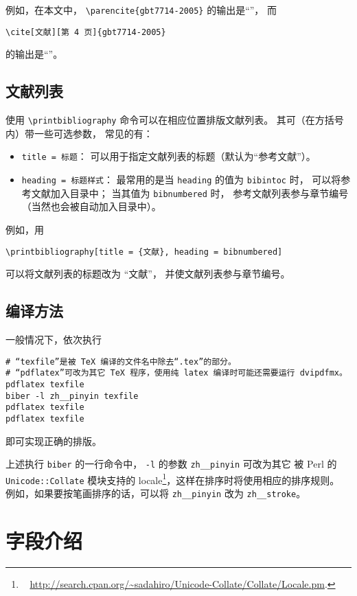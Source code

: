 \documentclass[UTF8]{ctexart}
\begin{document}
例如，在本文中，%
\verb|\parencite{gbt7714-2005}| 的输出是“\parencite{gbt7714-2005}”，
而
\begin{Verbatim}[frame = single]
\cite[文献][第 4 页]{gbt7714-2005}
\end{Verbatim}
的输出是“\cite[文献][第 4 页]{gbt7714-2005}”。

\subsection{文献列表}

使用 \verb|\printbibliography| 命令可以在相应位置排版文献列表。
其可（在方括号内）带一些可选参数\supercite{biblatex}，
常见的有：
\begin{itemize}
	\item \verb|title = 标题|：
		可以用于指定文献列表的标题（默认为“参考文献”）。
	\item \verb|heading = 标题样式|：
		最常用的是当 \verb|heading| 的值为 \verb|bibintoc| 时，
		可以将参考文献加入目录中；
		当其值为 \verb|bibnumbered| 时，
		参考文献列表参与章节编号（当然也会被自动加入目录中）。
\end{itemize}

例如，用
\begin{Verbatim}[frame = single]
\printbibliography[title = {文献}, heading = bibnumbered]
\end{Verbatim}
可以将文献列表的标题改为 “文献”，
并使文献列表参与章节编号。

\subsection{编译方法}

一般情况下，依次执行
\begin{Verbatim}[frame = single]
# “texfile”是被 TeX 编译的文件名中除去“.tex”的部分。
# “pdflatex”可改为其它 TeX 程序，使用纯 latex 编译时可能还需要运行 dvipdfmx。
pdflatex texfile
biber -l zh__pinyin texfile
pdflatex texfile
pdflatex texfile
\end{Verbatim}
即可实现正确的排版。

上述执行 \verb|biber| 的一行命令中，%
\verb|-l| 的参数 \verb|zh__pinyin| 可改为其它
被 Perl 的 \verb|Unicode::Collate| 模块支持的 locale\footnote{\ %
	\url{http://search.cpan.org/~sadahiro/Unicode-Collate/Collate/Locale.pm}.%
}，这样在排序时将使用相应的排序规则。
例如，如果要按笔画排序的话，可以将 \verb|zh__pinyin| 改为 \verb|zh__stroke|。

\section{字段介绍}\label{sec:fields}
\end{document}
